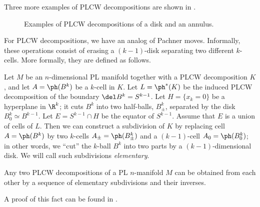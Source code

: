 Three more examples of PLCW decompositions are shown in .

\begin{figure}[ht]
  \centering
  \caption{Examples of PLCW decompositions of a disk and an annulus.}
  \label{f:plcw-examples}
\end{figure}

For PLCW decompositions, we have an analog of Pachner moves. Informally,
these operations consist of erasing a $(k-1)$-disk separating two different
$k$-cells. More formally, they are defined as follows.

Let $M$ be an $n$-dimensional PL manifold together with a PLCW
decomposition $K$, and let $A=\ph(B^k)$ be a $k$-cell in $K$. Let
$L=\ph^*(K)$ be the induced PLCW decomposition of the boundary $\del
B^k=S^{k-1}$. Let $H=\{x_k=0\}$ be a hyperplane in $\R^k$; it cuts $B^k$
into two half-balls, $B_{\pm}^k$, separated by the disk $B_0^k\simeq
B^{k-1}$. Let $E=S^{k-1}\cap H$ be the equator of $S^{k-1}$. Assume that
$E$ is a union of cells of $L$. Then we can construct a subdivision of $K$
by replacing cell $A=\ph(B^k)$ by two $k$-cells $A_\pm =\ph(B_\pm^k)$ and
a $(k-1)$-cell $A_0=\ph(B_0^k)$; in other words, we ``cut'' the $k$-ball
$B^k$ into two parts by a $(k-1)$-dimensional disk. We will call such
subdivisions \emph{elementary}.

\begin{theorem}\label{t:plcw-moves}
Any two PLCW decompositions of a PL $n$-manifold $M$ can be obtained from each
other by a sequence of elementary subdivisions and their inverses.
\end{theorem}
A proof of this fact can be found in \cite{PLCW}.

